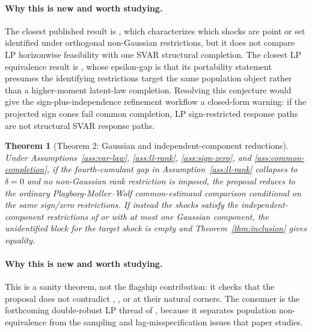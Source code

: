 \documentclass[11pt]{article}
\theoremstyle{definition}
\theoremstyle{plain}
\newtheorem{theorem}{Theorem}
\theoremstyle{remark}
\begin{document}
\paragraph{Why this is new and worth studying.}
The closest published result is \citet{LanneLiu2026}, which characterizes which shocks are point or set identified under orthogonal non-Gaussian restrictions, but it does not compare LP horizonwise feasibility with one SVAR structural completion.  The closest LP equivalence result is \citet{PlagborgMollerWolf2021}, whose epsilon-gap is that its portability statement presumes the identifying restrictions target the same population object rather than a higher-moment latent-law completion.  Resolving this conjecture would give the \citet{DrautzburgWright2023} sign-plus-independence refinement workflow a closed-form warning: if the projected sign cones fail common completion, LP sign-restricted response paths are not structural SVAR response paths.

\begin{theorem}[Theorem 2: Gaussian and independent-component reductions]\label{thm:reductions}
Under Assumptions~\ref{ass:var-law}, \ref{ass:ll-rank}, \ref{ass:sign-zero}, and \ref{ass:common-completion}, if the fourth-cumulant gap in Assumption~\ref{ass:ll-rank} collapses to $\delta=0$ and no non-Gaussian rank restriction is imposed, the proposal reduces to the ordinary Plagborg-Moller--Wolf common-estimand comparison conditional on the same sign/zero restrictions.  If instead the shocks satisfy the independent-component restrictions of \citet{GourierouxMonfortRenne2017} or \citet{LanneMeitzSaikkonen2017} with at most one Gaussian component, the unidentified block for the target shock is empty and Theorem~\ref{thm:inclusion} gives equality.
\end{theorem}

\paragraph{Why this is new and worth studying.}
This is a sanity theorem, not the flagship contribution: it checks that the proposal does not contradict \citet{PlagborgMollerWolf2021}, \citet{GourierouxMonfortRenne2017}, or \citet{LanneMeitzSaikkonen2017} at their natural corners.  The consumer is the forthcoming double-robust LP thread of \citet{MontielOleaPlagborgMollerQianWolf2024}, because it separates population non-equivalence from the sampling and lag-misspecification issues that paper studies.
\end{document}
